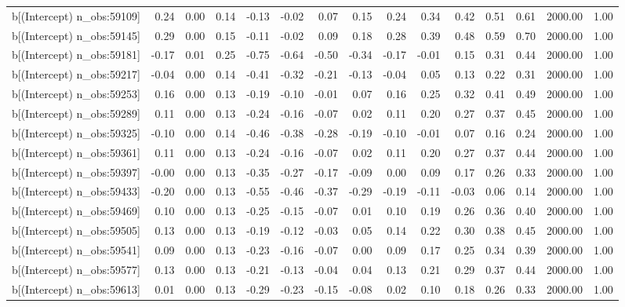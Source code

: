 \begin{table}[ht]
\begin{tabular}{rrrrrrrrrrrrrrr}
  b[(Intercept) n\_obs:59109] & 0.24 & 0.00 & 0.14 & -0.13 & -0.02 & 0.07 & 0.15 & 0.24 & 0.34 & 0.42 & 0.51 & 0.61 & 2000.00 & 1.00 \\ 
  b[(Intercept) n\_obs:59145] & 0.29 & 0.00 & 0.15 & -0.11 & -0.02 & 0.09 & 0.18 & 0.28 & 0.39 & 0.48 & 0.59 & 0.70 & 2000.00 & 1.00 \\ 
  b[(Intercept) n\_obs:59181] & -0.17 & 0.01 & 0.25 & -0.75 & -0.64 & -0.50 & -0.34 & -0.17 & -0.01 & 0.15 & 0.31 & 0.44 & 2000.00 & 1.00 \\ 
  b[(Intercept) n\_obs:59217] & -0.04 & 0.00 & 0.14 & -0.41 & -0.32 & -0.21 & -0.13 & -0.04 & 0.05 & 0.13 & 0.22 & 0.31 & 2000.00 & 1.00 \\ 
  b[(Intercept) n\_obs:59253] & 0.16 & 0.00 & 0.13 & -0.19 & -0.10 & -0.01 & 0.07 & 0.16 & 0.25 & 0.32 & 0.41 & 0.49 & 2000.00 & 1.00 \\ 
  b[(Intercept) n\_obs:59289] & 0.11 & 0.00 & 0.13 & -0.24 & -0.16 & -0.07 & 0.02 & 0.11 & 0.20 & 0.27 & 0.37 & 0.45 & 2000.00 & 1.00 \\ 
  b[(Intercept) n\_obs:59325] & -0.10 & 0.00 & 0.14 & -0.46 & -0.38 & -0.28 & -0.19 & -0.10 & -0.01 & 0.07 & 0.16 & 0.24 & 2000.00 & 1.00 \\ 
  b[(Intercept) n\_obs:59361] & 0.11 & 0.00 & 0.13 & -0.24 & -0.16 & -0.07 & 0.02 & 0.11 & 0.20 & 0.27 & 0.37 & 0.44 & 2000.00 & 1.00 \\ 
  b[(Intercept) n\_obs:59397] & -0.00 & 0.00 & 0.13 & -0.35 & -0.27 & -0.17 & -0.09 & 0.00 & 0.09 & 0.17 & 0.26 & 0.33 & 2000.00 & 1.00 \\ 
  b[(Intercept) n\_obs:59433] & -0.20 & 0.00 & 0.13 & -0.55 & -0.46 & -0.37 & -0.29 & -0.19 & -0.11 & -0.03 & 0.06 & 0.14 & 2000.00 & 1.00 \\ 
  b[(Intercept) n\_obs:59469] & 0.10 & 0.00 & 0.13 & -0.25 & -0.15 & -0.07 & 0.01 & 0.10 & 0.19 & 0.26 & 0.36 & 0.40 & 2000.00 & 1.00 \\ 
  b[(Intercept) n\_obs:59505] & 0.13 & 0.00 & 0.13 & -0.19 & -0.12 & -0.03 & 0.05 & 0.14 & 0.22 & 0.30 & 0.38 & 0.45 & 2000.00 & 1.00 \\ 
  b[(Intercept) n\_obs:59541] & 0.09 & 0.00 & 0.13 & -0.23 & -0.16 & -0.07 & 0.00 & 0.09 & 0.17 & 0.25 & 0.34 & 0.39 & 2000.00 & 1.00 \\ 
  b[(Intercept) n\_obs:59577] & 0.13 & 0.00 & 0.13 & -0.21 & -0.13 & -0.04 & 0.04 & 0.13 & 0.21 & 0.29 & 0.37 & 0.44 & 2000.00 & 1.00 \\ 
  b[(Intercept) n\_obs:59613] & 0.01 & 0.00 & 0.13 & -0.29 & -0.23 & -0.15 & -0.08 & 0.02 & 0.10 & 0.18 & 0.26 & 0.33 & 2000.00 & 1.00 \\ 

\end{tabular}
\end{table}
